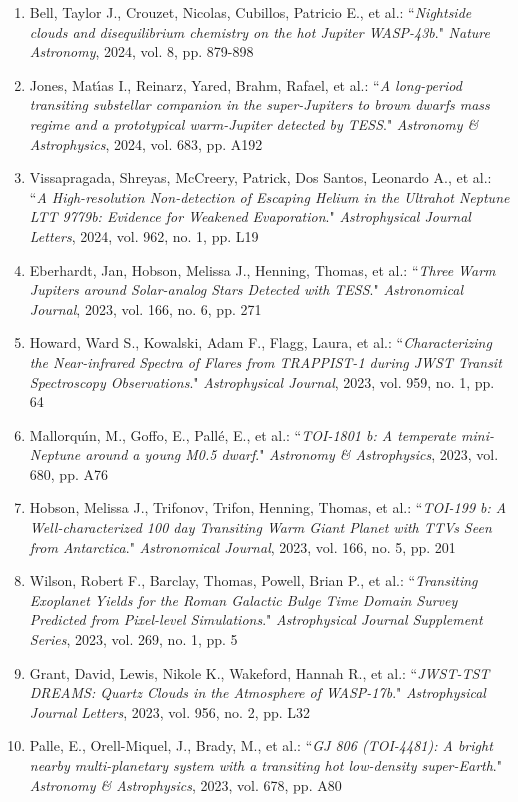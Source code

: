 \documentclass[12pt, a4paper]{article} %
\begin{document}
\begin{flushleft}
\begin{enumerate}
\item Bell, Taylor J., Crouzet, Nicolas, Cubillos, Patricio E., et al.: ``\textit{Nightside clouds and disequilibrium chemistry on the hot Jupiter WASP-43b}." \textit{Nature Astronomy}, 2024, vol. 8, pp. 879-898
\item Jones, Matı́as I., Reinarz, Yared, Brahm, Rafael, et al.: ``\textit{A long-period transiting substellar companion in the super-Jupiters to brown dwarfs mass regime and a prototypical warm-Jupiter detected by TESS}." \textit{Astronomy \& Astrophysics}, 2024, vol. 683, pp. A192
\item Vissapragada, Shreyas, McCreery, Patrick, Dos Santos, Leonardo A., et al.: ``\textit{A High-resolution Non-detection of Escaping Helium in the Ultrahot Neptune LTT 9779b: Evidence for Weakened Evaporation}." \textit{Astrophysical Journal Letters}, 2024, vol. 962, no. 1, pp. L19
\item Eberhardt, Jan, Hobson, Melissa J., Henning, Thomas, et al.: ``\textit{Three Warm Jupiters around Solar-analog Stars Detected with TESS}." \textit{Astronomical Journal}, 2023, vol. 166, no. 6, pp. 271
\item Howard, Ward S., Kowalski, Adam F., Flagg, Laura, et al.: ``\textit{Characterizing the Near-infrared Spectra of Flares from TRAPPIST-1 during JWST Transit Spectroscopy Observations}." \textit{Astrophysical Journal}, 2023, vol. 959, no. 1, pp. 64
\item Mallorquı́n, M., Goffo, E., Pallé, E., et al.: ``\textit{TOI-1801 b: A temperate mini-Neptune around a young M0.5 dwarf}." \textit{Astronomy \& Astrophysics}, 2023, vol. 680, pp. A76
\item Hobson, Melissa J., Trifonov, Trifon, Henning, Thomas, et al.: ``\textit{TOI-199 b: A Well-characterized 100 day Transiting Warm Giant Planet with TTVs Seen from Antarctica}." \textit{Astronomical Journal}, 2023, vol. 166, no. 5, pp. 201
\item Wilson, Robert F., Barclay, Thomas, Powell, Brian P., et al.: ``\textit{Transiting Exoplanet Yields for the Roman Galactic Bulge Time Domain Survey Predicted from Pixel-level Simulations}." \textit{Astrophysical Journal Supplement Series}, 2023, vol. 269, no. 1, pp. 5
\item Grant, David, Lewis, Nikole K., Wakeford, Hannah R., et al.: ``\textit{JWST-TST DREAMS: Quartz Clouds in the Atmosphere of WASP-17b}." \textit{Astrophysical Journal Letters}, 2023, vol. 956, no. 2, pp. L32
\item Palle, E., Orell-Miquel, J., Brady, M., et al.: ``\textit{GJ 806 (TOI-4481): A bright nearby multi-planetary system with a transiting hot low-density super-Earth}." \textit{Astronomy \& Astrophysics}, 2023, vol. 678, pp. A80

\end{enumerate}
\end{flushleft}
\end{document}
